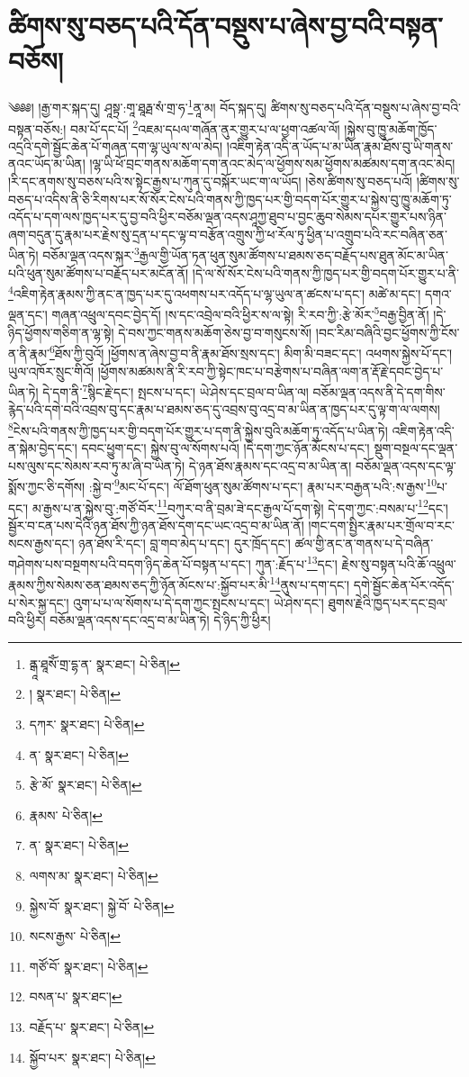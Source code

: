 \setcounter{footnote}{0} 
\chapter{ཚིགས་སུ་བཅད་པའི་དོན་བསྡུས་པ་ཞེས་བྱ་བའི་བསྟན་བཅོས།}༄༅༅། །རྒྱ་གར་སྐད་དུ། ཤཱསྟྲ་:གཱ་ཐཱརྠ་སཾ་གྲ་ཧ་\footnote{ནྒཱ་ཐཱསོཾ་གྲ་དྷ་ན་  སྣར་ཐང་།  པེ་ཅིན། }ནཱ་མ། བོད་སྐད་དུ། ཚིགས་སུ་བཅད་པའི་དོན་བསྡུས་པ་ཞེས་བྱ་བའི་བསྟན་བཅོས:། བམ་པོ་དང་པོ། \footnote{།    སྣར་ཐང་།  པེ་ཅིན། }འཇམ་དཔལ་གཞོན་ནུར་གྱུར་པ་ལ་ཕྱག་འཚལ་ལོ། །སྐྱེས་བུ་ཁྱུ་མཆོག་ཁྱོད་འདྲའི་དགེ་སྦྱོང་ཆེན་པོ་གཞན་དག་ལྷ་ཡུལ་ས་ལ་མེད། །འཇིག་རྟེན་འདི་ན་ཡོད་པ་མ་ཡིན་རྣམ་ཐོས་བུ་ཡི་གནས་ནའང་ཡོད་མ་ཡིན། །ལྷ་ཡི་ཕོ་བྲང་གནས་མཆོག་དག་ནའང་མེད་ལ་ཕྱོགས་སམ་ཕྱོགས་མཚམས་དག་ནའང་མེད། །རི་དང་ནགས་སུ་བཅས་པའི་ས་སྟེང་རྒྱས་པ་ཀུན་དུ་བསྐོར་ཡང་ག་ལ་ཡོད། །ཅེས་ཚིགས་སུ་བཅད་པའོ། །ཚིགས་སུ་བཅད་པ་འདིས་ནི་ཅི་རིགས་པར་སོ་སོར་ངེས་པའི་གནས་ཀྱི་ཁྱད་པར་གྱི་བདག་པོར་གྱུར་པ་སྐྱེས་བུ་ཁྱུ་མཆོག་ཏུ་འདོད་པ་དག་ལས་ཁྱད་པར་དུ་བྱ་བའི་ཕྱིར་བཅོམ་ལྡན་འདས་ཤཱཀྱ་ཐུབ་པ་བྱང་ཆུབ་སེམས་དཔར་གྱུར་པས་ཉིན་ཞག་བདུན་དུ་རྣམ་པར་རྗེས་སུ་དྲན་པ་དང་ལྟ་བ་བརྩོན་འགྲུས་ཀྱི་ཕ་རོལ་ཏུ་ཕྱིན་པ་འགྲུབ་པའི་རང་བཞིན་ཅན་ཡིན་ཏེ། བཅོམ་ལྡན་འདས་སྐར་\footnote{དཀར་  སྣར་ཐང་།  པེ་ཅིན། }རྒྱལ་གྱི་ཡོན་ཏན་ཕུན་སུམ་ཚོགས་པ་ཐམས་ཅད་བརྗོད་པས་ཐུན་མོང་མ་ཡིན་པའི་ཕུན་སུམ་ཚོགས་པ་བརྗོད་པར་མངོན་ནོ། །དེ་ལ་སོ་སོར་ངེས་པའི་གནས་ཀྱི་ཁྱད་པར་གྱི་བདག་པོར་གྱུར་པ་ནི་\footnote{ན་  སྣར་ཐང་།  པེ་ཅིན། }འཇིག་རྟེན་རྣམས་ཀྱི་ནང་ན་ཁྱད་པར་དུ་འཕགས་པར་འདོད་པ་ལྷ་ཡུལ་ན་ཚངས་པ་དང་། མཚེ་མ་དང་། དགའ་ལྡན་དང་། གཞན་འཕྲུལ་དབང་བྱེད་དོ། །ས་དང་འབྲེལ་བའི་ཕྱིར་ས་ལ་སྟེ། རི་རབ་ཀྱི་:རྩེ་མོར་\footnote{རྩེ་མོ་  སྣར་ཐང་།  པེ་ཅིན། }བརྒྱ་བྱིན་ནོ། །དེ་ཉིད་ཕྱོགས་གཅིག་ན་ལྷ་སྟེ། དེ་བས་ཀྱང་གནས་མཆོག་ཅེས་བྱ་བ་གསུངས་སོ། །བང་རིམ་བཞིའི་བྱང་ཕྱོགས་ཀྱི་ངོས་ན་ནི་རྣམ་\footnote{རྣམས་  པེ་ཅིན། }ཐོས་ཀྱི་བུའོ། །ཕྱོགས་ན་ཞེས་བྱ་བ་ནི་རྣམ་ཐོས་སྲས་དང་། མིག་མི་བཟང་དང་། འཕགས་སྐྱེས་པོ་དང་། ཡུལ་འཁོར་སྲུང་གིའོ། །ཕྱོགས་མཚམས་ནི་རི་རབ་ཀྱི་སྟེང་ཁང་པ་བརྩེགས་པ་བཞིན་ལག་ན་རྡོ་རྗེ་དབང་བྱེད་པ་ཡིན་ཏེ། དེ་དག་ནི་\footnote{ན་  སྣར་ཐང་།  པེ་ཅིན། }སྙིང་རྗེ་དང་། སྤངས་པ་དང་། ཡེ་ཤེས་དང་བྲལ་བ་ཡིན་ལ། བཅོམ་ལྡན་འདས་ནི་དེ་དག་གིས་རྙེད་པའི་དགེ་བའི་འབྲས་བུ་དང་རྣམ་པ་ཐམས་ཅད་དུ་འབྲས་བུ་འདྲ་བ་མ་ཡིན་ན་ཁྱད་པར་དུ་ལྟ་ག་ལ་ལགས། \footnote{ལགས་མ་  སྣར་ཐང་།  པེ་ཅིན། }ངེས་པའི་གནས་ཀྱི་ཁྱད་པར་གྱི་བདག་པོར་གྱུར་པ་དག་ནི་སྐྱེས་བུའི་མཆོག་ཏུ་འདོད་པ་ཡིན་ཏེ། འཇིག་རྟེན་འདི་ན་སྐེམ་བྱེད་དང་། དབང་ཕྱུག་དང་། སྐྱེས་བུ་ལ་སོགས་པའོ། །དེ་དག་ཀྱང་ཉོན་མོངས་པ་དང་། སྡུག་བསྔལ་དང་ལྡན་པས་ལུས་དང་སེམས་རབ་ཏུ་མ་ཞི་བ་ཡིན་ཏེ། དེ་ཉན་ཐོས་རྣམས་དང་འདྲ་བ་མ་ཡིན་ན། བཅོམ་ལྡན་འདས་དང་ལྟ་སྨོས་ཀྱང་ཅི་དགོས། :སྐྱེ་བ་\footnote{སྐྱེས་བོ་  སྣར་ཐང་། སྐྱེ་བོ་  པེ་ཅིན། }མང་པོ་དང་། ལོ་ཐོག་ཕུན་སུམ་ཚོགས་པ་དང་། རྣམ་པར་བརྒྱན་པའི་:ས་རྒྱས་\footnote{སངས་རྒྱས་  པེ་ཅིན། }པ་དང་། མ་རྒྱས་པ་ན་སྐྱེས་བུ་:གཙོ་བོར་\footnote{གཙོ་བོ་  སྣར་ཐང་།  པེ་ཅིན། }བཀུར་བ་ནི་བྲམ་ཟེ་དང་རྒྱལ་པོ་དག་སྟེ། དེ་དག་ཀྱང་:བསམ་པ་\footnote{བསན་པ་  སྣར་ཐང་། }དང་། སྦྱོར་བ་ངན་པས་དེའི་ཉན་ཐོས་ཀྱི་ཉན་ཐོས་དག་དང་ཡང་འདྲ་བ་མ་ཡིན་ནོ། །གང་དག་སྤྱིར་རྣམ་པར་གྲོལ་བ་རང་སངས་རྒྱས་དང་། ཉན་ཐོས་རི་དང་། བླ་གབ་མེད་པ་དང་། དུར་ཁྲོད་དང་། ཚལ་གྱི་ནང་ན་གནས་པ་དེ་བཞིན་གཤེགས་པས་བསྔགས་པའི་བདག་ཉིད་ཆེན་པོ་བསྟན་པ་དང་། ཀུན་:རྗོད་པ་\footnote{བརྗོད་པ་  སྣར་ཐང་།  པེ་ཅིན། }དང་། རྗེས་སུ་བསྟན་པའི་ཆོ་འཕྲུལ་རྣམས་ཀྱིས་སེམས་ཅན་ཐམས་ཅད་ཀྱི་ཉོན་མོངས་པ་:སྐྱོབ་པར་མི་\footnote{སྐྱོབ་པར་  སྣར་ཐང་།  པེ་ཅིན། }ནུས་པ་དག་དང་། དགེ་སྦྱོང་ཆེན་པོར་འདོད་པ་སེར་སྐྱ་དང་། འུག་པ་པ་ལ་སོགས་པ་དེ་དག་ཀྱང་སྤངས་པ་དང་། ཡེ་ཤེས་དང་། ཐུགས་རྗེའི་ཁྱད་པར་དང་བྲལ་བའི་ཕྱིར། བཅོམ་ལྡན་འདས་དང་འདྲ་བ་མ་ཡིན་ཏེ། དེ་ཉིད་ཀྱི་ཕྱིར། 